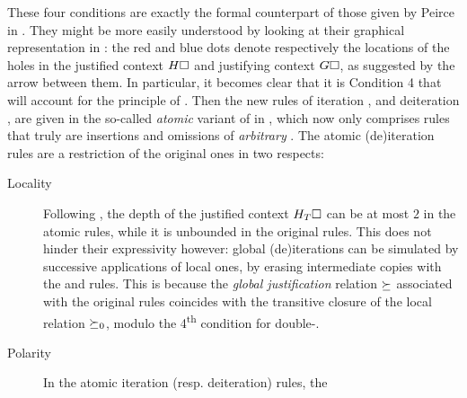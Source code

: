 \begin{scope}
These four conditions are exactly the formal counterpart of those given by
Peirce in \cite{peirce_prolegomena_1906}. They might be more easily understood
by looking at their graphical representation in :
the red and blue dots denote respectively the locations of the holes in the
justified context $H\square$ and justifying context $G\square$, as suggested by the
arrow between them. In particular, it becomes clear that it is Condition 4 that
will account for the principle of . Then the new rules of
iteration ,  and deiteration ,
 are given in the so-called \emph{atomic} variant  of
 in , which now only comprises rules that
truly are insertions and omissions of \emph{arbitrary} . The atomic (de)iteration
rules are a restriction of the original ones in two respects:
\begin{description}
  \item[Locality] Following , the depth of the
  justified context $H_T\square$ can be at most $2$ in the atomic rules, while it
  is unbounded in the original rules. This does not hinder their expressivity
  however: global (de)iterations can be simulated by successive applications of
  local ones, by erasing intermediate copies with the  and 
  rules. This is because the \emph{global justification} relation $\mathbin{\succeq}$
  associated with the original rules coincides with the transitive closure of
  the local relation $\mathbin{\succeq_0}$, modulo the 4\textsuperscript{th} condition for
  double-.
  \item[Polarity] In the atomic iteration (resp. deiteration) rules, the

\end{description}
\end{scope}
